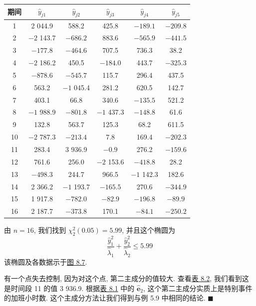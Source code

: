 
\begin{mvtable}
\label{tab:8.2}
\begin{tabular}{cccccc}
\toprule
期间 & $\hat{y}_{j1}$ & $\hat{y}_{j2}$ & $\hat{y}_{j3}$ & $\hat{y}_{j4}$ & $\hat{y}_{j5}$\\
\midrule
1 & 2 044.9 & 588.2 & 425.8 & $-189.1$ & $-209.8$\\
2 & $-2$ 143.7 & $-686.2$ & 883.6 & $-565.9$ & $-441.5$\\
3 & $-177.8$ & $-464.6$ & 707.5 & 736.3 & 38.2\\
4 & $-2$ 186.2 & 450.5 & $-184.0$ & 443.7 & $-325.3$\\
5 & $-878.6$ & $-545.7$ & 115.7 & 296.4 & 437.5\\
6 & 563.2 & $-1$ 045.4 & 281.2 & 620.5 & 142.7\\
7 & 403.1 & 66.8 & 340.6 & $-135.5$ & 521.2\\
8 & $-1$ 988.9 & $-801.8$ & $-1$ 437.3 & $-148.8$ & 61.6\\
9 & 132.8 & 563.7 & 125.3 & 68.2 & 611.5\\
10 & $-2$ 787.3 & $-213.4$ & 7.8 & 169.4 & $-202.3$\\
11 & 283.4 & 3 936.9 & $-0.9$ & 276.2 & $-159.6$\\
12 & 761.6 & 256.0 & $-2$ 153.6 & $-418.8$ & 28.2\\
13 & $-498.3$ & 244.7 & 966.5 & $-1$ 142.3 & 182.6\\
14 & 2 366.2 & $-1$ 193.7 & $-165.5$ & 270.6 & $-344.9$\\
15 & 1 917.8 & $-782.0$ & $-82.9$ & $-196.8$ & $-89.9$\\
16 & 2 187.7 & $-373.8$ & 170.1 & $-84.1$ & $-250.2$\\
\bottomrule
\end{tabular}
\end{mvtable}

由 $n=16$, 我们找到 $\chi_2^2(0.05)=5.99$, 并且这个椭圆为
\[
\frac{\hat{y}_1^2}{\hat{\lambda}_1}+\frac{\hat{y}_2^2}{\hat{\lambda}_2}\leqslant 5.99
\]
该椭圆及各数据示于\hyperref[fig:8.7]{图 8.7}.

有一个点失去控制, 因为对这个点, 第二主成分的值较大. 查看\hyperref[tab:8.2]{表 8.2}, 我们看到这是时间段 11 的值 3 936.9. 根据\hyperref[tab:8.1]{表 8.1} 中的 $\hat{\mathbf{e}}_2$, 这个第二主成分实质上是特别事件的加班小时数. 这个主成分方法让我们得到与例 5.9 中相同的结论. \hfill$\blacksquare$

